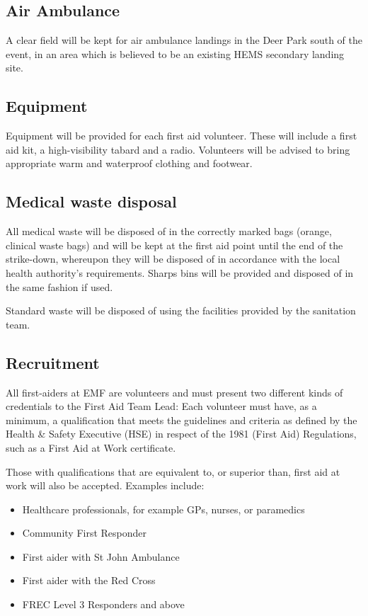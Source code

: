\subsection{Air Ambulance}

A clear field will be kept for air ambulance landings in the Deer Park south of
the event, in an area which is believed to be an existing HEMS secondary landing
site.

\subsection{Equipment}
Equipment will be provided for each first aid volunteer. These will include a
first aid kit, a high-visibility tabard and a radio. Volunteers will be advised
to bring appropriate warm and waterproof clothing and footwear.

\subsection{Medical waste disposal}
All medical waste will be disposed of in the correctly marked bags (orange,
clinical waste bags) and will be kept at the first aid point until the end of
the strike-down, whereupon they will be disposed of in accordance with the
local health authority's requirements. Sharps bins will be provided and
disposed of in the same fashion if used.

Standard waste will be disposed of using the facilities provided by the sanitation team.

\subsection{Recruitment}
All first-aiders at EMF are volunteers and must present two different kinds of
credentials to the First Aid Team Lead: Each volunteer must have, as a minimum,
a qualification that meets the guidelines and criteria as defined by the Health
\& Safety Executive (HSE) in respect of the 1981 (First Aid) Regulations, such
as a First Aid at Work certificate.

Those with qualifications that are equivalent to, or superior than,
first aid at work will also be accepted. Examples include:

\begin{itemize}
 \tightlist
  \item Healthcare professionals, for example GPs, nurses, or paramedics
  \item Community First Responder
  \item First aider with St John Ambulance
  \item First aider with the Red Cross
  \item FREC Level 3 Responders and above
\end{itemize}

